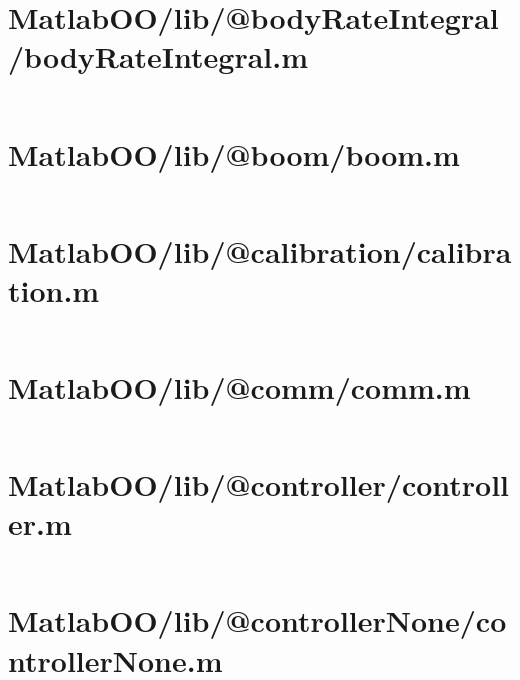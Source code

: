 \pagebreak
\section*{MatlabOO/lib/@bodyRateIntegral/bodyRateIntegral.m}\label{code:MatlabOO/lib/@bodyRateIntegral/bodyRateIntegral.m}
\inputminted[linenos,fontsize=\scriptsize]{matlab}{/home/dcouture/git/mathyourlife/TSatPy/beta_versions/matlab_object_oriented/lib/@bodyRateIntegral/bodyRateIntegral.m}

\pagebreak
\section*{MatlabOO/lib/@boom/boom.m}\label{code:MatlabOO/lib/@boom/boom.m}
\inputminted[linenos,fontsize=\scriptsize]{matlab}{/home/dcouture/git/mathyourlife/TSatPy/beta_versions/matlab_object_oriented/lib/@boom/boom.m}

\pagebreak
\section*{MatlabOO/lib/@calibration/calibration.m}\label{code:MatlabOO/lib/@calibration/calibration.m}
\inputminted[linenos,fontsize=\scriptsize]{matlab}{/home/dcouture/git/mathyourlife/TSatPy/beta_versions/matlab_object_oriented/lib/@calibration/calibration.m}

\pagebreak
\section*{MatlabOO/lib/@comm/comm.m}\label{code:MatlabOO/lib/@comm/comm.m}
\inputminted[linenos,fontsize=\scriptsize]{matlab}{/home/dcouture/git/mathyourlife/TSatPy/beta_versions/matlab_object_oriented/lib/@comm/comm.m}

\pagebreak
\section*{MatlabOO/lib/@controller/controller.m}\label{code:MatlabOO/lib/@controller/controller.m}
\inputminted[linenos,fontsize=\scriptsize]{matlab}{/home/dcouture/git/mathyourlife/TSatPy/beta_versions/matlab_object_oriented/lib/@controller/controller.m}

\pagebreak
\section*{MatlabOO/lib/@controllerNone/controllerNone.m}\label{code:MatlabOO/lib/@controllerNone/controllerNone.m}
\inputminted[linenos,fontsize=\scriptsize]{matlab}{/home/dcouture/git/mathyourlife/TSatPy/beta_versions/matlab_object_oriented/lib/@controllerNone/controllerNone.m}

